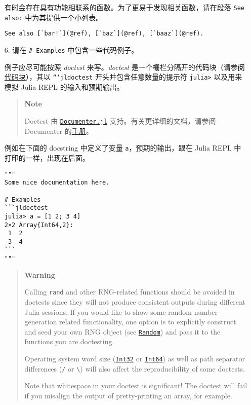 \begin{itemize}
有时会存在具有功能相联系的函数。为了更易于发现相关函数，请在段落 \texttt{See also:} 中为其提供一个小列表。


\begin{lstlisting}
See also [`bar!`](@ref), [`baz`](@ref), [`baaz`](@ref).
\end{lstlisting}


\item[6.  ] 请在 \texttt{\# Examples} 中包含一些代码例子。

例子应尽可能按照 \emph{doctest} 来写。\emph{doctest} 是一个栅栏分隔开的代码块（请参阅\hyperlink{14660894509460337656}{代码块}），其以 \texttt{```jldoctest} 开头并包含任意数量的提示符 \texttt{julia>} 以及用来模拟 Julia REPL 的输入和预期输出。

\begin{quote}
\textbf{Note}

Doctest 由 \href{https://github.com/JuliaDocs/Documenter.jl}{\texttt{Documenter.jl}} 支持。有关更详细的文档，请参阅 Documenter 的\href{https://juliadocs.github.io/Documenter.jl/}{手册}。

\end{quote}
例如在下面的 docstring 中定义了变量 \texttt{a}，预期的输出，跟在 Julia REPL 中打印的一样，出现在后面。


\begin{verbatim}
"""
Some nice documentation here.

# Examples
```jldoctest
julia> a = [1 2; 3 4]
2×2 Array{Int64,2}:
 1  2
 3  4
```
"""
\end{verbatim}

\begin{quote}
\textbf{Warning}

Calling \texttt{rand} and other RNG-related functions should be avoided in doctests since they will not produce consistent outputs during different Julia sessions. If you would like to show some random number generation related functionality, one option is to explicitly construct and seed your own RNG object (see \hyperlink{6526948166346290584}{\texttt{Random}}) and pass it to the functions you are doctesting.

Operating system word size (\hyperlink{10103694114785108551}{\texttt{Int32}} or \hyperlink{7720564657383125058}{\texttt{Int64}}) as well as path separator differences (\texttt{/} or \texttt{{\textbackslash}}) will also affect the reproducibility of some doctests.

Note that whitespace in your doctest is significant! The doctest will fail if you misalign the output of pretty-printing an array, for example.


\end{quote}
\end{itemize}
